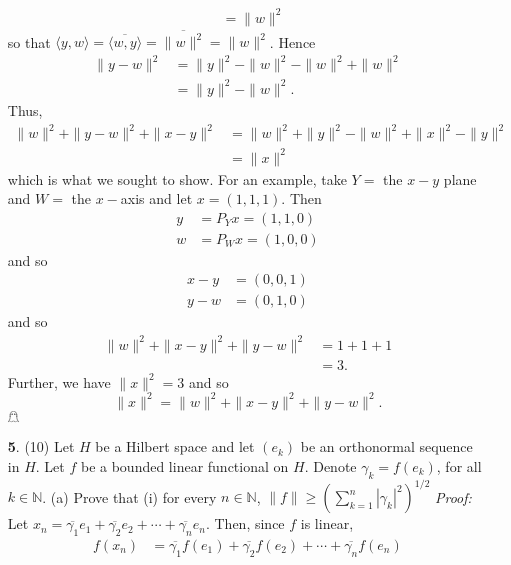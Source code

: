 \documentclass{article}
\begin{document}
\begin{itemize}
\begin{align*}
        &= \|w\|^2
    \end{align*}
    so that $\langle y, w\rangle = \overline{\langle w, y\rangle} = \overline{\|w\|^2} = \|w\|^2$. Hence
    \begin{align*}
        \|y - w\|^2 &= \|y\|^2 - \|w\|^2 - \|w\|^2 + \|w\|^2\\
        &= \|y\|^2 - \|w\|^2.
    \end{align*}
    Thus,
    \begin{align*}
        \|w\|^2 + \|y - w\|^2 + \|x - y\|^2 &= \|w\|^2 + \|y\|^2 - \|w\|^2 + \|x\|^2 - \|y\|^2\\\
        &= \|x\|^2
    \end{align*}
    which is what we sought to show.
    \newline\newline
    For an example, take $Y = $ the $x-y$ plane and $W = $ the $x-$axis and let $x = (1,1,1)$. Then 
    \begin{align*}
        y &= P_Yx = (1,1,0)\\
        w &= P_Wx = (1,0,0)
    \end{align*}
    and so 
    \begin{align*}
        x - y &= (0,0,1)\\
        y - w &= (0,1,0)
    \end{align*}
    and so
    \begin{align*}
        \|w\|^2 + \|x - y\|^2 + \|y - w\|^2 &= 1 + 1 + 1\\
        &= 3.
    \end{align*}
    Further, we have $\|x\|^2 = 3$ and so 
    \[\|x\|^2 = \|w\|^2 + \|x - y\|^2 + \|y - w\|^2.\]
    \hfill $\mathghost$
    \pagebreak
    \item[\textbf{5}.] (10) Let $H$ be a Hilbert space and let $(e_k)$ be an orthonormal sequence in $H$. Let $f$ be a bounded linear functional on $H$. Denote $\gamma_k = f(e_k)$, for all $k \in \mathbb{N}$. 
    \newline
    (a) Prove that 
    \newline\newline
    (i) for every $n \in \mathbb{N}$, $\|f\| \geq (\sum_{k = 1}^n |\gamma_k|^2)^{1/2}$
    \newline
    \textit{Proof:} Let $x_n = \overline{\gamma_1}e_1 + \overline{\gamma_2}e_2 + \cdots + \overline{\gamma_n}e_n$. Then, since $f$ is linear,
    \begin{align*}
        f(x_n) &= \overline{\gamma_1}f(e_1) + \overline{\gamma_2}f(e_2) + \cdots + \overline{\gamma_n}f(e_n)\\

\end{align*}
\end{itemize}
\end{document}
